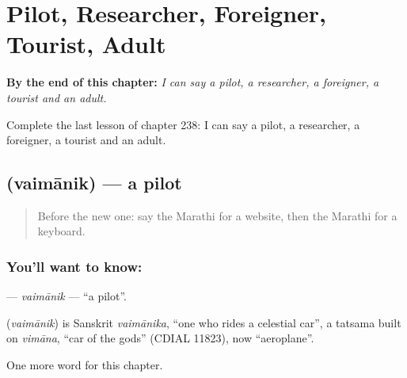 
\chapter{Pilot, Researcher, Foreigner, Tourist, Adult}
\label{ch:mr-pilot-researcher-foreigner-tourist-adult}

\begin{chapteropening}
\textbf{By the end of this chapter:} \emph{I can say a pilot, a researcher, a foreigner, a tourist and an adult.}

Complete the last lesson of chapter 238: I can say a pilot, a researcher, a foreigner, a tourist and an adult.
\end{chapteropening}

\section[\texorpdfstring{\mr{वैमानिक} (vaimānik)}{वैमानिक (vaimānik)}]{ (vaimānik) — a pilot}

\label{lesson:MR-C238-vaimanik}



\begin{quote}
Before the new one: say the Marathi for a website, then the Marathi for a keyboard.
\end{quote}

\subsection*{You'll want to know: }
\textbf{} — \emph{vaimānik} — \textquotedblleft{}a pilot\textquotedblright{}.

\begin{cousinweb}
\textbf{} (\emph{vaimānik}) is Sanskrit \emph{vaimānika}, \textquotedblleft{}one who rides a celestial car\textquotedblright{}, a tatsama built on \emph{vimāna}, \textquotedblleft{}car of the gods\textquotedblright{} (CDIAL 11823), now \textquotedblleft{}aeroplane\textquotedblright{}.
\end{cousinweb}

\begin{grammarlens}[title={What you've built}]
One more word for this chapter.
\end{grammarlens}

